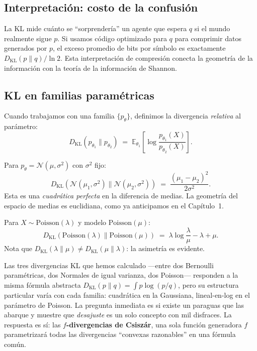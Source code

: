 \subsection{Interpretación: costo de la confusión}

La KL mide cuánto se ``sorprendería'' un agente que espera $q$ si el mundo realmente sigue $p$.  Si usamos código optimizado para $q$ para comprimir datos generados por $p$, el exceso promedio de bits por símbolo es exactamente $D_{\mathrm{KL}}(p \| q) / \ln 2$.  Esta interpretación de compresión conecta la geometría de la información con la teoría de la información de Shannon.

\subsection{KL en familias paramétricas}

Cuando trabajamos con una familia $\{p_\theta\}$, definimos la divergencia \emph{relativa} al parámetro:
\[
D_{\mathrm{KL}}(p_{\theta_1} \| p_{\theta_2}) \;=\; \mathbb{E}_{\theta_1}\!\left[\log \frac{p_{\theta_1}(X)}{p_{\theta_2}(X)}\right].
\]

\begin{example}
	Para $p_{\theta} = \mathcal{N}(\mu, \sigma^2)$ con $\sigma^2$ fijo:
	\[
	D_{\mathrm{KL}}(\mathcal{N}(\mu_1, \sigma^2) \| \mathcal{N}(\mu_2, \sigma^2)) \;=\; \frac{(\mu_1 - \mu_2)^2}{2\sigma^2}.
	\]
	Esta es una \emph{cuadrática perfecta} en la diferencia de medias.  La geometría del espacio de medias es euclidiana, como ya anticipamos en el Capítulo~1.
\end{example}

\begin{example}
	Para $X \sim \mathrm{Poisson}(\lambda)$ y modelo $\mathrm{Poisson}(\mu)$:
	\[
	D_{\mathrm{KL}}(\mathrm{Poisson}(\lambda) \| \mathrm{Poisson}(\mu)) \;=\; \lambda \log \frac{\lambda}{\mu} - \lambda + \mu.
	\]
	Nota que $D_{\mathrm{KL}}(\lambda \| \mu) \ne D_{\mathrm{KL}}(\mu \| \lambda)$: la asimetría es evidente.
\end{example}

Las tres divergencias KL que hemos calculado ---entre dos Bernoulli paramétricas, dos Normales de igual varianza, dos Poisson--- responden a la misma fórmula abstracta $D_{\mathrm{KL}}(p\|q)=\int p\log(p/q)$, pero su estructura particular varía con cada familia: cuadrática en la Gaussiana, lineal-en-log en el parámetro de Poisson. La pregunta inmediata es si existe un paraguas que las abarque y muestre que \emph{desajuste} es un solo concepto con mil disfraces. La respuesta es sí: las \textbf{$f$-divergencias de Csiszár}, una sola función generadora $f$ parametrizará todas las divergencias ``convexas razonables'' en una fórmula común.


